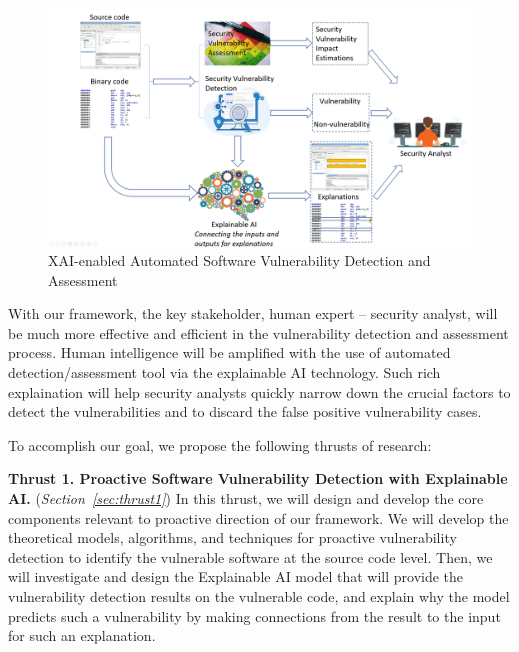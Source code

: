 \begin{figure}[t]
	\centering
	\includegraphics[width=5in]{figures/satc-illustration}
	\caption{XAI-enabled Automated Software Vulnerability Detection and Assessment}
	\label{fig:overview}
\end{figure}

With our framework, the key stakeholder, human expert -- security
analyst, will be much more effective and efficient in the
vulnerability detection and assessment process. Human intelligence
will be amplified with the use of automated detection/assessment tool
via the explainable AI technology. Such rich explaination will help
security analysts quickly narrow down the crucial factors to detect
the vulnerabilities and to discard the false positive vulnerability
cases.

To accomplish our goal, we propose the following thrusts of research:


\vspace{3pt}
\noindent \textbf{Thrust 1. Proactive Software Vulnerability Detection
  with Explainable AI.} ({\em Section~\ref{sec:thrust1}}) In this
thrust, we will design and develop the core components relevant to
proactive direction of our framework. We will develop the
theoretical models, algorithms, and techniques for proactive
vulnerability detection to identify the vulnerable software at the
source code level. Then, we will investigate and design the
Explainable AI model that will provide the vulnerability detection
results on the vulnerable code, and explain why the model
predicts such a vulnerability by making connections from the result to
the input for such an explanation.

